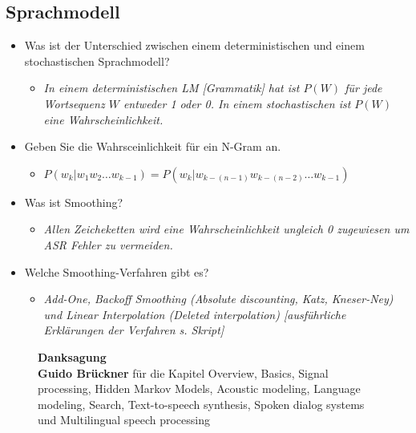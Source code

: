 \documentclass[11pt]{article}
\begin{document}
\subsection{Sprachmodell}
\begin{itemize}
\item Was ist der Unterschied zwischen einem deterministischen und einem stochastischen Sprachmodell?
\begin{itemize}
\item \emph{In einem deterministischen LM [Grammatik] hat ist $P(W)$ für jede Wortsequenz $W$ entweder 1 oder 0. In einem stochastischen ist $P(W)$ eine Wahrscheinlichkeit.}
\end{itemize}
\item Geben Sie die Wahrsceinlichkeit für ein N-Gram an.
\begin{itemize}
\item $P(w_k | w_1w_2\dots w_{k-1}) = P(w_k | w_{k-(n-1)}w_{k-(n-2)}\dots w_{k-1})$
\end{itemize}
\item Was ist Smoothing?
\begin{itemize}
\item \emph{Allen Zeicheketten wird eine Wahrscheinlichkeit ungleich 0 zugewiesen um ASR Fehler zu vermeiden.}
\end{itemize}
\item Welche Smoothing-Verfahren gibt es?
\begin{itemize}
\item \emph{Add-One, Backoff Smoothing (Absolute discounting, Katz, Kneser-Ney) und Linear Interpolation (Deleted interpolation) [ausführliche Erklärungen der Verfahren s. Skript]}
\end{itemize}
\end{itemize}

\newpage

\begin{figure}
\centering
\textbf{Danksagung} \\
\textbf{Guido Brückner} für die Kapitel Overview, Basics, Signal processing, Hidden Markov Models, Acoustic modeling, Language modeling, Search, Text-to-speech synthesis, Spoken dialog systems und Multilingual speech processing
\end{figure}
\end{document}
